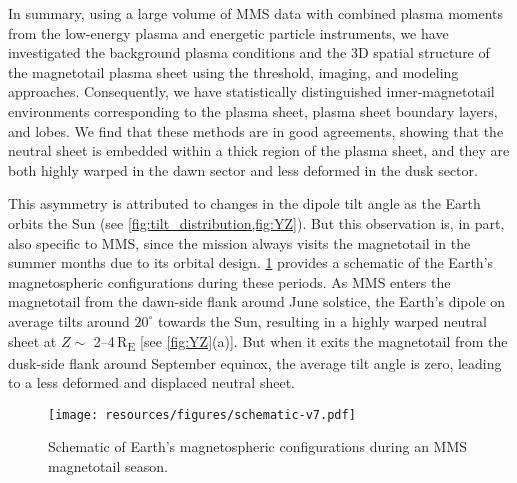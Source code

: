 \documentclass[draft]{agujournal2019}
\begin{document}
In summary, using a large volume of MMS data with combined plasma moments from the low-energy plasma and energetic particle instruments, we have investigated the background plasma conditions and the 3D spatial structure of the magnetotail plasma sheet using the threshold, imaging, and modeling approaches. Consequently, we have statistically distinguished inner-magnetotail environments corresponding to the plasma sheet, plasma sheet boundary layers, and lobes. We find that these methods are in good agreements, showing that the neutral sheet is embedded within a thick region of the plasma sheet, and they are both highly warped in the dawn sector and less deformed in the dusk sector.

This asymmetry is attributed to changes in the dipole tilt angle as the Earth orbits the Sun (see \cref{fig:tilt_distribution,fig:YZ}). But this observation is, in part, also specific to MMS, since the mission always visits the magnetotail in the summer months due to its orbital design. \cref{fig:sketch} provides a schematic of the Earth's magnetospheric configurations during these periods. As MMS enters the magnetotail from the dawn-side flank around June solstice, the Earth's dipole on average tilts around $20^\circ$ towards the Sun, resulting in a highly warped neutral sheet at $Z\sim$ 2--4\,\si{R_E} [see \cref{fig:YZ}(a)]. But when it exits the magnetotail from the dusk-side flank around September equinox, the average tilt angle is zero, leading to a less deformed and displaced neutral sheet. 

\begin{figure}
\centering
\noindent\texttt{[image: resources/figures/schematic-v7.pdf]}
\caption{
    Schematic of Earth's magnetospheric configurations during an MMS magnetotail season. 
}
\label{fig:sketch}
\end{figure}
\end{document}
